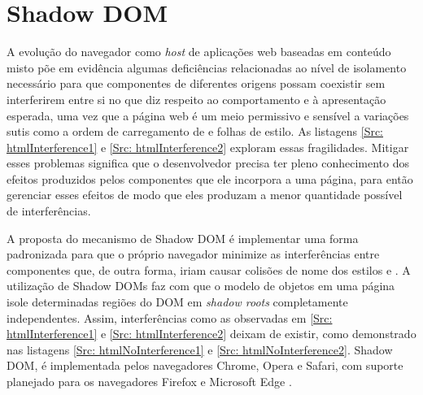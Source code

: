 
\section{Shadow DOM}

A evolução do navegador como \textit{host} de aplicações web baseadas em conteúdo misto põe em evidência algumas deficiências relacionadas ao nível de isolamento necessário para que componentes de diferentes origens possam coexistir sem interferirem entre si no que diz respeito ao comportamento e à apresentação esperada, uma vez que a página web é um meio permissivo e sensível a variações sutis como a ordem de carregamento de \scripts{} e folhas de estilo. As listagens \ref{Src: htmlInterference1} e \ref{Src: htmlInterference2} exploram essas fragilidades. Mitigar esses problemas significa que o desenvolvedor precisa ter pleno conhecimento dos efeitos produzidos pelos componentes que ele incorpora a uma página, para então gerenciar esses efeitos de modo que eles produzam a menor quantidade possível de interferências.

A proposta do mecanismo de Shadow DOM é implementar uma forma padronizada para que o próprio navegador minimize as interferências entre componentes que, de outra forma, iriam causar colisões de nome dos estilos e \scripts{}. A utilização de Shadow DOMs faz com que o modelo de objetos em uma página isole determinadas regiões do DOM em \textit{shadow roots} completamente independentes. Assim, interferências como as observadas em \ref{Src: htmlInterference1} e \ref{Src: htmlInterference2} deixam de existir, como demonstrado nas listagens \ref{Src: htmlNoInterference1} e \ref{Src: htmlNoInterference2}. Shadow DOM,  é implementada pelos navegadores Chrome, Opera e Safari, com suporte planejado para os navegadores Firefox e Microsoft Edge .